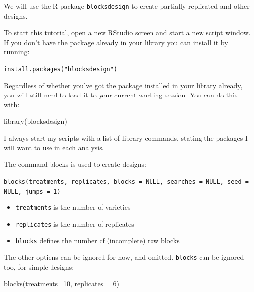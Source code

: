 \documentclass[
]{book}
\newenvironment{Shaded}{\begin{snugshade}}{\end{snugshade}}
\newcommand{\AttributeTok}[1]{\textcolor[rgb]{0.77,0.63,0.00}{#1}}
\newcommand{\DecValTok}[1]{\textcolor[rgb]{0.00,0.00,0.81}{#1}}
\newcommand{\FunctionTok}[1]{\textcolor[rgb]{0.00,0.00,0.00}{#1}}
\newcommand{\NormalTok}[1]{#1}
\providecommand{\tightlist}{%
  \setlength{\itemsep}{0pt}\setlength{\parskip}{0pt}}
\begin{document}
We will use the R package \texttt{blocksdesign}\citep{R-blocksdesign} to create partially replicated and other designs.

To start this tutorial, open a new RStudio screen and start a new script window. If you don't have the package already in your library you can install it by running:

\texttt{install.packages("blocksdesign")}

Regardless of whether you've got the package installed in your library already, you will still need to load it to your current working session. You can do this with:

\begin{Shaded}
\begin{Highlighting}[]
\FunctionTok{library}\NormalTok{(blocksdesign)}
\end{Highlighting}
\end{Shaded}

I always start my scripts with a list of library commands, stating the packages I will want to use in each analysis.

The command blocks is used to create designs:

\texttt{blocks(treatments,\ replicates,\ blocks\ =\ NULL,\ searches\ =\ NULL,\ seed\ =\ NULL,\ jumps\ =\ 1)}

\begin{itemize}
\tightlist
\item
  \texttt{treatments} is the number of varieties
\item
  \texttt{replicates} is the number of replicates
\item
  \texttt{blocks} defines the number of (incomplete) row blocks
\end{itemize}

The other options can be ignored for now, and omitted. \texttt{blocks} can be ignored too, for simple designs:

\begin{Shaded}
\begin{Highlighting}[]
\FunctionTok{blocks}\NormalTok{(}\AttributeTok{treatments=}\DecValTok{10}\NormalTok{, }\AttributeTok{replicates =} \DecValTok{6}\NormalTok{)}
\end{Highlighting}
\end{Shaded}
\end{document}
